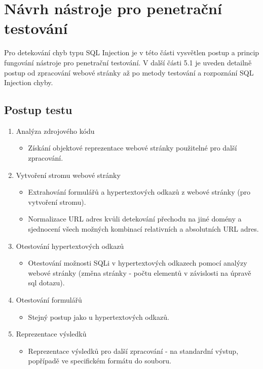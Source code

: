 
\chapter{Návrh nástroje pro penetrační testování}
Pro detekování chyb typu SQL Injection je v této části vysvětlen postup a princip fungování nástroje pro penetrační testování. V další části 5.1 je uveden detailně postup od zpracování webové stránky až po metody testování a rozpoznání SQL Injection chyby.

\section{Postup testu}
\begin{enumerate}
\item Analýza zdrojového kódu 
\begin{itemize}
\item Získání objektové reprezentace webové stránky použitelné pro další zpracování.
\end{itemize}
\item Vytvoření stromu webové stránky
\begin{itemize}
\item Extrahování formulářů a hypertextových odkazů z webové stránky (pro vytvoření stromu).
\item Normalizace URL adres kvůli detekování přechodu na jiné domény a sjednocení všech možných kombinací relativních a absolutních URL adres.
\end{itemize}
\item Otestování hypertextových odkazů
\begin{itemize}
\item Otestování možnosti SQLi v hypertextových odkazech pomocí analýzy webové stránky (změna stránky - počtu elementů v závislosti na úpravě sql dotazu).
\end{itemize}
\item Otestování formulářů
\begin{itemize}
\item Stejný postup jako u hypertextových odkazů.
\end{itemize}
\item Reprezentace výsledků
\begin{itemize}
\item Reprezentace výsledků pro další zpracování - na standardní výstup, popřípadě ve specifickém formátu do souboru.
\end{itemize}
\end{enumerate}

